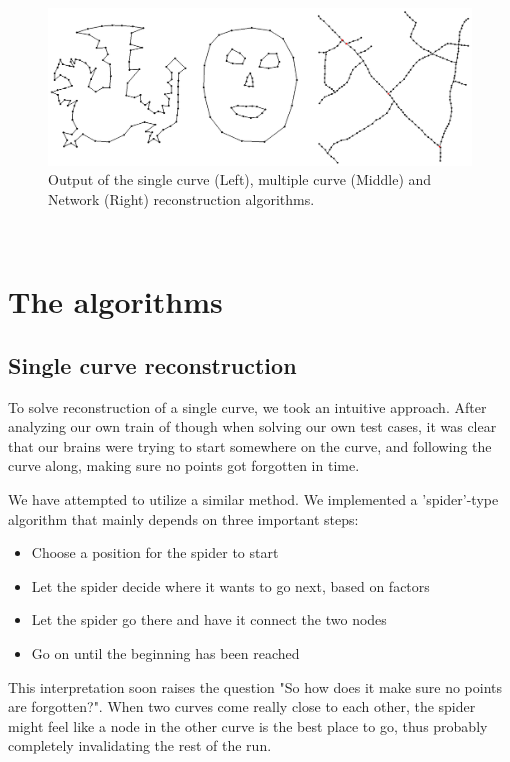 \documentclass[11pt]{article}
\begin{document}
\begin{figure}[ht!]
\centering
\includegraphics[scale=0.3]{images/outputOverview.png}
\caption{Output of the single curve (Left), multiple curve (Middle) and Network (Right) reconstruction algorithms.}
\label{outputOverview}
\end{figure}$ $\\

\section{The algorithms}
\label{se:algorithms}

\subsection{Single curve reconstruction}
To solve reconstruction of a single curve, we took an intuitive approach. After analyzing our own train of though when solving our own test cases, it was clear that our brains were trying to start somewhere on the curve, and following the curve along, making sure no points got forgotten in time.

We have attempted to utilize a similar method. We implemented a 'spider'-type algorithm that mainly depends on three important steps:
\begin{itemize}
\item Choose a position for the spider to start
\item Let the spider decide where it wants to go next, based on factors
\item Let the spider go there and have it connect the two nodes
\item Go on until the beginning has been reached
\end{itemize}

This interpretation soon raises the question "So how does it make sure no points are forgotten?".
When two curves come really close to each other, the spider might feel like a node in the other curve is the best place to go, thus probably completely invalidating the rest of the run.
\end{document}
